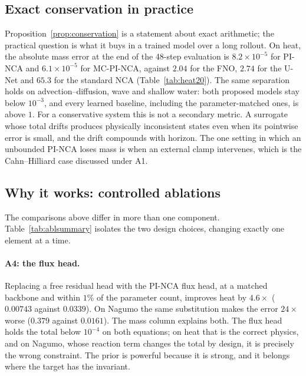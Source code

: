 \documentclass{article}
\begin{document}
\subsection{Exact conservation in practice}
Proposition~\ref{prop:conservation} is a statement about exact arithmetic; the practical
question is what it buys in a trained model over a long rollout. On heat, the absolute mass
error at the end of the 48-step evaluation is $8.2\times10^{-5}$ for PI-NCA and
$6.1\times10^{-5}$ for MC-PI-NCA, against $2.04$ for the FNO, $2.74$ for the U-Net and
$65.3$ for the standard NCA (Table~\ref{tab:heat20}). The same separation holds on
advection--diffusion, wave and shallow water: both proposed models stay below $10^{-3}$,
and every learned baseline, including the parameter-matched ones, is above $1$. For a
conservative system this is not a secondary metric. A surrogate whose total drifts
produces physically inconsistent states even when its pointwise error is small, and the
drift compounds with horizon. The one setting in which an unbounded PI-NCA loses mass is
when an external clamp intervenes, which is the Cahn--Hilliard case discussed under A1.

\subsection{Why it works: controlled ablations}
\label{sec:ablation}
The comparisons above differ in more than one component. Table~\ref{tab:ablsummary}
isolates the two design choices, changing exactly one element at a time.



\paragraph{A4: the flux head.} Replacing a free residual head with the PI-NCA flux head, at
a matched backbone and within $1\%$ of the parameter count, improves heat by $4.6\times$
($0.00743$ against $0.0339$). On Nagumo the same substitution makes the error $24\times$
worse ($0.379$ against $0.0161$). The mass column explains both. The flux head holds the
total below $10^{-4}$ on both equations; on heat that is the correct physics, and on Nagumo,
whose reaction term changes the total by design, it is precisely the wrong constraint. The
prior is powerful because it is strong, and it belongs where the target has the invariant.
\end{document}

